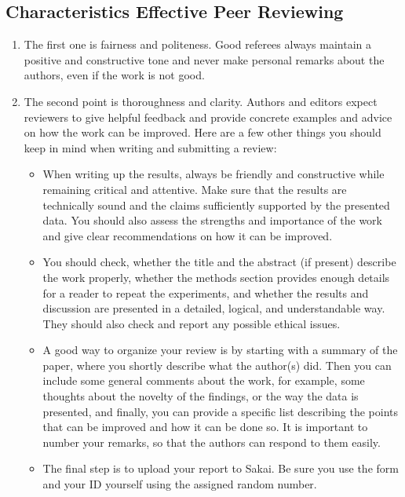 \documentclass{tufte-handout}\usepackage[]{graphicx}\usepackage[]{color}
\begin{document}
\subsection{Characteristics Effective Peer Reviewing}

\begin{enumerate}
	\item The first one is fairness and politeness. Good referees always maintain a positive and constructive tone and never make personal remarks about the authors, even if the work is not good. 
	\item The second point is thoroughness and clarity. Authors and editors expect reviewers to give helpful feedback and provide concrete examples and advice on how the work can be improved. Here are a few other things you should keep in mind when writing and submitting a review:
  \begin{itemize}
    \item When writing up the results, always be friendly and constructive while remaining critical and attentive. Make sure that the results are technically sound and the claims sufficiently supported by the presented data. You should also assess the strengths and importance of the work and give clear recommendations on how it can be improved.
    \item You should check, whether the title and the abstract (if present) describe the work properly, whether the methods section provides enough details for a reader to repeat the experiments, and whether the results and discussion are presented in a detailed, logical, and understandable way. They should also check and report any possible ethical issues.
    \item A good way to organize your review is by starting with a summary of the paper, where you shortly describe what the author(s) did. Then you can include some general comments about the work, for example, some thoughts about the novelty of the findings, or the way the data is presented, and finally, you can provide a specific list describing the points that can be improved and how it can be done so. It is important to number your remarks, so that the authors can respond to them easily.
    \item The final step is to upload your report to Sakai. Be sure you use the form and your ID yourself using the assigned random number. 
    
  \end{itemize}
  
\end{enumerate}
\end{document}
